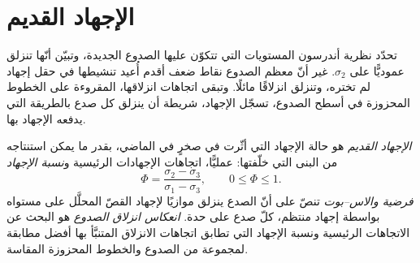 \begin{omfigure}

\par{}\label{fig:b3:structural-analysis:flinn}
\end{omfigure}

\section{الإجهاد القديم}\label{sec:b3:structural-analysis:palaeostress}

تحدّد نظرية أندرسون المستويات التي تتكوّن عليها الصدوع الجديدة، وتبيّن أنّها تنزلق
عموديًّا على $\sigma_2$. غير أنّ معظم الصدوع نقاط ضعف أقدم
أُعيد تنشيطها في حقل إجهاد لم تختره، وتنزلق
انزلاقًا مائلًا. وتبقى اتجاهات انزلاقها، المقروءة على الخطوط المحزوزة في أسطح الصدوع،
تسجّل الإجهاد، شريطة أن ينزلق كل صدع بالطريقة التي
يدفعه الإجهاد بها.

\begin{definition}\label{def:b3:structural-analysis:palaeostress}
\emph{الإجهاد القديم} هو حالة الإجهاد التي أثّرت في
صخرٍ في الماضي، بقدر ما يمكن استنتاجه من البنى التي خلّفتها:
عمليًّا، اتجاهات الإجهادات الرئيسية
و\emph{نسبة الإجهاد}
\[
  \Phi = \frac{\sigma_2 - \sigma_3}{\sigma_1 - \sigma_3}, \qquad 0 \le \Phi
  \le 1 .
\]
\emph{فرضية والاس--بوت} تنصّ
على أنّ الصدع ينزلق موازيًا لإجهاد القصّ المحلَّل على مستواه بواسطة إجهاد
منتظم، كلّ صدع على حدة. \emph{انعكاس انزلاق
الصدوع} هو البحث عن الاتجاهات الرئيسية
ونسبة الإجهاد التي تطابق اتجاهات الانزلاق المتنبَّأ بها أفضل مطابقة لمجموعة
من الصدوع والخطوط المحزوزة المقاسة.
\end{definition}

